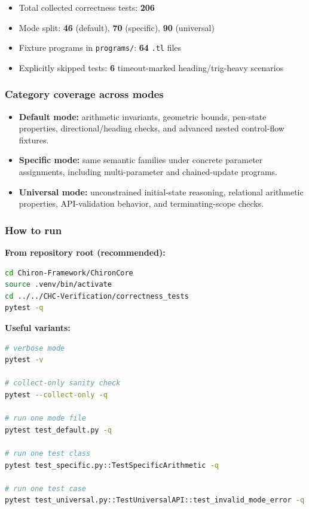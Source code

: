 \begin{itemize}[leftmargin=1.5em]
	\item Total collected correctness tests: \textbf{206}
	\item Mode split: \textbf{46} (default), \textbf{70} (specific), \textbf{90} (universal)
	\item Fixture programs in \texttt{programs/}: \textbf{64} \texttt{.tl} files
	\item Explicitly skipped tests: \textbf{6} timeout-marked heading/trig-heavy scenarios
\end{itemize}

\subsubsection*{Category coverage across modes}

\begin{itemize}[leftmargin=1.5em]
	\item \textbf{Default mode:} arithmetic invariants, geometric bounds, pen-state properties, directional/heading checks, and advanced nested control-flow fixtures.
	\item \textbf{Specific mode:} same semantic families under concrete parameter assignments, including multi-parameter and chained-update programs.
	\item \textbf{Universal mode:} unconstrained initial-state reasoning, relational arithmetic properties, API-validation behavior, and terminating-scope checks.
\end{itemize}

\subsubsection*{How to run}

\textbf{From repository root (recommended):}
\begin{lstlisting}[style=terminal, language=bash]
cd Chiron-Framework/ChironCore
source .venv/bin/activate
cd ../../CHC-Verification/correctness_tests
pytest -q
\end{lstlisting}

\textbf{Useful variants:}
\begin{lstlisting}[style=terminal, language=bash]
# verbose mode
pytest -v

# collect-only sanity check
pytest --collect-only -q

# run one mode file
pytest test_default.py -q

# run one test class
pytest test_specific.py::TestSpecificArithmetic -q

# run one test case
pytest test_universal.py::TestUniversalAPI::test_invalid_mode_error -q
\end{lstlisting}

